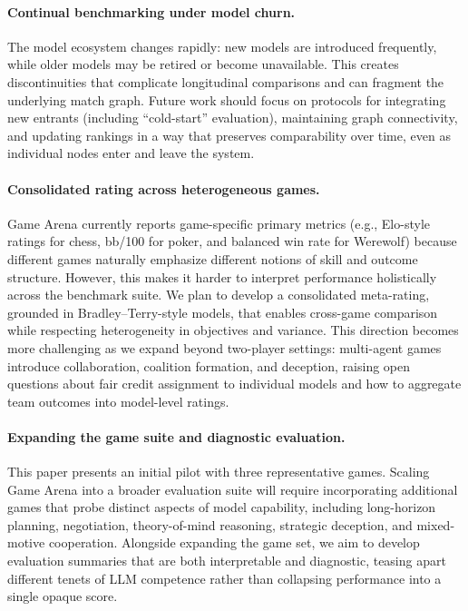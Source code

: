 \documentclass{article}
\begin{document}
\paragraph{Continual benchmarking under model churn.}
The model ecosystem changes rapidly: new models are introduced frequently, while older models may be retired or become unavailable. This creates discontinuities that complicate longitudinal comparisons and can fragment the underlying match graph. Future work should focus on protocols for integrating new entrants (including ``cold-start'' evaluation), maintaining graph connectivity, and updating rankings in a way that preserves comparability over time, even as individual nodes enter and leave the system.

\paragraph{Consolidated rating across heterogeneous games.}
Game Arena currently reports game-specific primary metrics (e.g., Elo-style ratings for chess, bb/100 for poker, and balanced win rate for Werewolf) because different games naturally emphasize different notions of skill and outcome structure. However, this makes it harder to interpret performance holistically across the benchmark suite. We plan to develop a consolidated meta-rating, grounded in Bradley--Terry-style models, that enables cross-game comparison while respecting heterogeneity in objectives and variance. This direction becomes more challenging as we expand beyond two-player settings: multi-agent games introduce collaboration, coalition formation, and deception, raising open questions about fair credit assignment to individual models and how to aggregate team outcomes into model-level ratings.

\paragraph{Expanding the game suite and diagnostic evaluation.}
This paper presents an initial pilot with three representative games. Scaling Game Arena into a broader evaluation suite will require incorporating additional games that probe distinct aspects of model capability, including long-horizon planning, negotiation, theory-of-mind reasoning, strategic deception, and mixed-motive cooperation. Alongside expanding the game set, we aim to develop evaluation summaries that are both interpretable and diagnostic, teasing apart different tenets of LLM competence rather than collapsing performance into a single opaque score.
\end{document}

